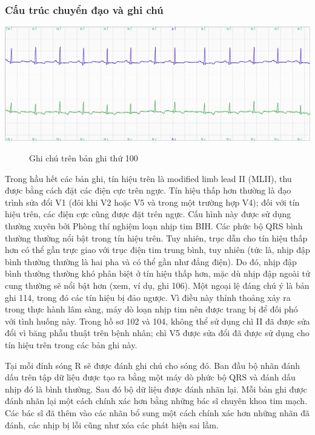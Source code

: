 \subsubsection{Cấu trúc chuyển đạo và ghi chú}
\begin{center}
    \includegraphics[scale=.4]{image/chapter2/100bee.png}
    \begin{figure}[htp]
    \begin{center}
    \end{center}
    \caption{Ghi chú trên bản ghi thứ 100}
    \end{figure}
\end{center}
Trong hầu hết các bản ghi, tín hiệu trên là modified limb lead II (MLII), thu được bằng cách đặt các điện cực trên ngực. Tín hiệu thấp hơn thường là đạo trình sửa đổi V1 (đôi khi V2 hoặc V5 và trong một trường hợp V4); đối với tín hiệu trên, các điện cực cũng được đặt trên ngực. Cấu hình này được sử dụng thường xuyên bởi Phòng thí nghiệm loạn nhịp tim BIH. Các phức bộ QRS bình thường thường nổi bật trong tín hiệu trên. Tuy nhiên, trục dẫn cho tín hiệu thấp hơn có thể gần trực giao với trục điện tim trung bình, tuy nhiên (tức là, nhịp đập bình thường thường là hai pha và có thể gần như đẳng điện). Do đó, nhịp đập bình thường thường khó phân biệt ở tín hiệu thấp hơn, mặc dù nhịp đập ngoài tử cung thường sẽ nổi bật hơn (xem, ví dụ, ghi 106). Một ngoại lệ đáng chú ý là bản ghi 114, trong đó các tín hiệu bị đảo ngược. Vì điều này thỉnh thoảng xảy ra trong thực hành lâm sàng, máy dò loạn nhịp tim nên được trang bị để đối phó với tình huống này. Trong hồ sơ 102 và 104, không thể sử dụng chì II đã được sửa đổi vì băng phẫu thuật trên bệnh nhân; chì V5 được sửa đổi đã được sử dụng cho tín hiệu trên trong các bản ghi này.\par
Tại mỗi đỉnh sóng R sẽ được đánh ghi chú cho sóng đó. Ban đầu bộ nhãn đánh dấu trên tập dữ liệu được tạo ra bằng một máy dò phức bộ QRS và đánh dấu nhịp đó là bình thường. Sau đó bộ dữ liệu được đánh nhãn lại. Mỗi bản ghi được đánh nhãn lại một cách chính xác hơn bằng những bác sĩ chuyên khoa tim mạch. Các bác sĩ đã thêm vào các nhãn bổ sung một cách chính xác hơn những nhãn đã đánh, các nhịp bị lỗi cũng như xóa các phát hiện sai lầm.

